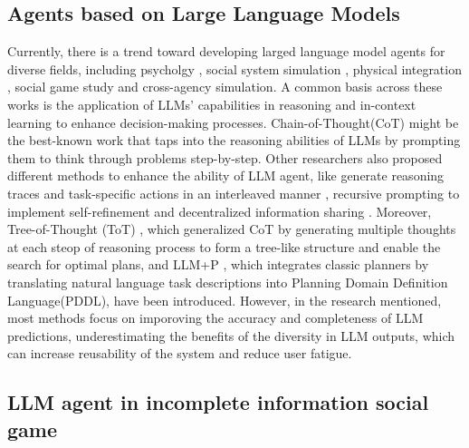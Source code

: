 \documentclass[11pt]{article}
\begin{document}
\subsection{Agents based on Large Language Models} \label{sec:llm_agent}
Currently, there is a trend toward developing larged language model agents for diverse fields, including psycholgy \citep{aher2023using}, social system simulation \citep{gao2023social,zhou2023sotopia}, physical integration \citep{ahn2022can}, social game study \citep{xu2023exploring,wang2023avalon} and cross-agency simulation\citep{park2023generative}. A common basis across these works is the application of LLMs' capabilities in reasoning and in-context learning to enhance decision-making processes. Chain-of-Thought(CoT) \citep{wei2022chain} might be the best-known work that taps into the reasoning abilities of LLMs by prompting them to think through problems step-by-step. Other researchers also proposed different methods to enhance the ability of LLM agent, like generate reasoning traces and task-specific actions in an interleaved manner \citep{yao2022react}, recursive prompting to implement self-refinement \citep{madaan2024self} and decentralized information sharing \citep{zhang2023building}. Moreover, Tree-of-Thought (ToT) \citep{yao2024tree}, which generalized CoT by generating multiple thoughts at each steop of reasoning process to form a tree-like structure and enable the search for optimal plans, and LLM+P \citep{liu2023llm+}, which integrates classic planners by translating natural language task descriptions into Planning Domain Definition Language(PDDL), have been introduced. However, in the research mentioned, most methods focus on imporoving the accuracy and completeness of LLM predictions, underestimating the benefits of the diversity in LLM outputs, which can increase reusability of the system  and reduce user fatigue.


\subsection{LLM agent in incomplete information social game} \label{sec:llm_agent_social_game}
\end{document}
